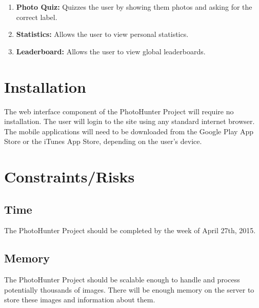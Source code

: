 \documentclass{article}
\begin{document}
\begin{enumerate}

  \item \textbf {Photo Quiz:} Quizzes the user by showing them photos and
        asking for the correct label.

  \item \textbf{Statistics:} Allows the user to view personal statistics.

  \item \textbf{Leaderboard:} Allows the user to view global leaderboards.

\end{enumerate}
	 
\section{Installation}
The web interface component of the PhotoHunter Project will require no
installation. The user will login to the site using any standard internet
browser. The mobile applications will need to be downloaded from the Google
Play App Store or the iTunes App Store, depending on the user's device.

\section{Constraints/Risks}

\subsection{Time}
The PhotoHunter Project should be completed by the week of April 27th, 2015.

\subsection{Memory}
The PhotoHunter Project should be scalable enough to handle and process
potentially thousands of images. There will be enough memory on the server to
store these images and information about them.
\end{document}
